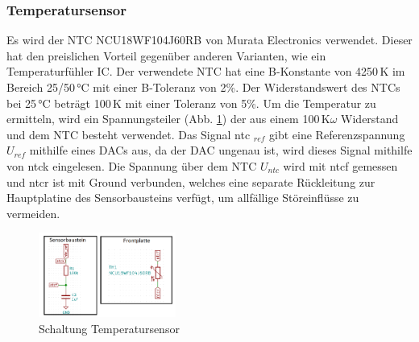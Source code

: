 \subsubsection{Temperatursensor} \label{Temperatursensor}
Es wird der NTC NCU18WF104J60RB von Murata Electronics verwendet. Dieser hat den preislichen Vorteil gegenüber anderen Varianten, wie ein Temperaturfühler IC. Der verwendete NTC hat eine B-Konstante von 4250\,K im Bereich 25/50\,°C mit einer B-Toleranz von 2\%. Der Widerstandswert des NTCs bei 25\,°C beträgt 100\,K mit einer Toleranz von 5\%. Um die Temperatur zu ermitteln, wird ein Spannungsteiler (Abb. \ref{pic: Temperatursensor}) der aus einem 100\,K$\omega$ Widerstand und dem NTC besteht verwendet. Das Signal ntc $_{ref}$ gibt eine Referenzspannung $U_{ref}$ mithilfe eines DACs aus, da der DAC ungenau ist, wird dieses Signal mithilfe von ntck eingelesen. Die Spannung über dem NTC $U_{ntc}$ wird mit ntcf gemessen und ntcr ist mit Ground verbunden, welches eine separate Rückleitung zur Hauptplatine des Sensorbausteins verfügt, um allfällige Störeinflüsse zu vermeiden.

\begin{figure}[h!]
	\centering
	\includegraphics[width=0.4\textwidth]{graphics/shematics_sensor_Temp.png}
	\caption{Schaltung Temperatursensor}
	\label{pic: Temperatursensor}
\end{figure}

